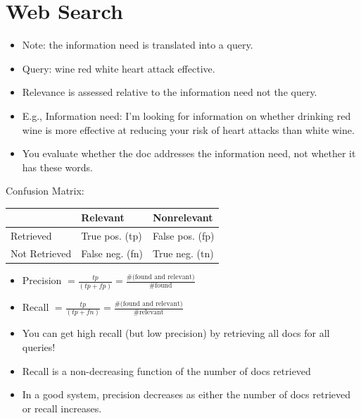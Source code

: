 
\section{Web Search}

\begin{breakbox}
\begin{itemize}
	\item Note: the information need is translated into a query.
	\item Query: wine red white heart attack effective.
	\item Relevance is assessed relative to the information need not the query.
	\item E.g., Information need: I'm looking for information on whether drinking red wine is more effective at reducing your risk of heart attacks than white wine.
	\item You evaluate whether the doc addresses the information need, not whether it has these words.
\end{itemize}
\end{breakbox}

\begin{breakbox}
\newline Confusion Matrix:
\begin{center}
\begin{tabular}{| l | l | l |}
\hline
 & Relevant & Nonrelevant \\ \hline
Retrieved	& True pos. (tp) & False pos. (fp) \\ \hline
Not Retrieved & False neg. (fn) & True neg. (tn) \\
\hline
\end{tabular}
\end{center}
\begin{itemize}
	\item Precision $= \frac{tp}{(tp + fp)} = \frac{\text{\# (found and relevant)}}{\text{\# found}}$
	\item Recall $= \frac{tp}{(tp + fn)} = \frac{\text{\# (found and relevant)}}{\text{\# relevant}}$
\end{itemize}
\begin{center}
\end{center}
\end{breakbox}

\begin{breakbox}
\begin{itemize}
	\item You can get high recall (but low precision) by retrieving all docs for all queries!
	\item Recall is a non-decreasing function of the number of docs retrieved
	\item In a good system, precision decreases as either the number of docs retrieved or recall increases.
\end{itemize}
\end{breakbox}

